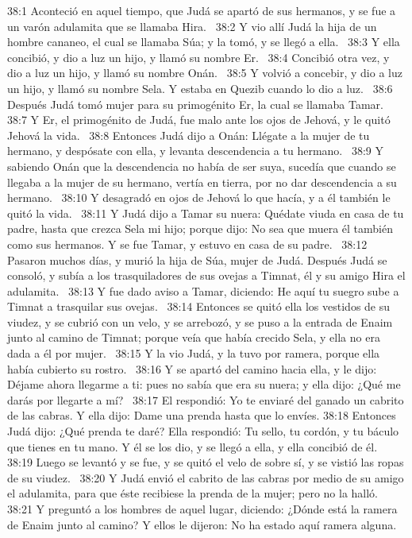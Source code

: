 38:1 Aconteció en aquel tiempo, que Judá se apartó de sus hermanos, y se fue a un varón adulamita que se llamaba Hira.  
38:2 Y vio allí Judá la hija de un hombre cananeo, el cual se llamaba Súa; y la tomó, y se llegó a ella.  
38:3 Y ella concibió, y dio a luz un hijo, y llamó su nombre Er.  
38:4 Concibió otra vez, y dio a luz un hijo, y llamó su nombre Onán.  
38:5 Y volvió a concebir, y dio a luz un hijo, y llamó su nombre Sela. Y estaba en Quezib cuando lo dio a luz.  
38:6 Después Judá tomó mujer para su primogénito Er, la cual se llamaba Tamar.  
38:7 Y Er, el primogénito de Judá, fue malo ante los ojos de Jehová, y le quitó Jehová la vida.  
38:8 Entonces Judá dijo a Onán: Llégate a la mujer de tu hermano, y despósate con ella, y levanta descendencia a tu hermano.  
38:9 Y sabiendo Onán que la descendencia no había de ser suya, sucedía que cuando se llegaba a la mujer de su hermano, vertía en tierra, por no dar descendencia a su hermano.  
38:10 Y desagradó en ojos de Jehová lo que hacía, y a él también le quitó la vida.  
38:11 Y Judá dijo a Tamar su nuera: Quédate viuda en casa de tu padre, hasta que crezca Sela mi hijo; porque dijo: No sea que muera él también como sus hermanos. Y se fue Tamar, y estuvo en casa de su padre.  
38:12 Pasaron muchos días, y murió la hija de Súa, mujer de Judá. Después Judá se consoló, y subía a los trasquiladores de sus ovejas a Timnat, él y su amigo Hira el adulamita.  
38:13 Y fue dado aviso a Tamar, diciendo: He aquí tu suegro sube a Timnat a trasquilar sus ovejas.  
38:14 Entonces se quitó ella los vestidos de su viudez, y se cubrió con un velo, y se arrebozó, y se puso a la entrada de Enaim junto al camino de Timnat; porque veía que había crecido Sela, y ella no era dada a él por mujer.  
38:15 Y la vio Judá, y la tuvo por ramera, porque ella había cubierto su rostro.  
38:16 Y se apartó del camino hacia ella, y le dijo: Déjame ahora llegarme a ti: pues no sabía que era su nuera; y ella dijo: ¿Qué me darás por llegarte a mí?  
38:17 El respondió: Yo te enviaré del ganado un cabrito de las cabras. Y ella dijo: Dame una prenda hasta que lo envíes. 
38:18 Entonces Judá dijo: ¿Qué prenda te daré? Ella respondió: Tu sello, tu cordón, y tu báculo que tienes en tu mano. Y él se los dio, y se llegó a ella, y ella concibió de él.  
38:19 Luego se levantó y se fue, y se quitó el velo de sobre sí, y se vistió las ropas de su viudez.  
38:20 Y Judá envió el cabrito de las cabras por medio de su amigo el adulamita, para que éste recibiese la prenda de la mujer; pero no la halló.  
38:21 Y preguntó a los hombres de aquel lugar, diciendo: ¿Dónde está la ramera de Enaim junto al camino? Y ellos le dijeron: No ha estado aquí ramera alguna.  

